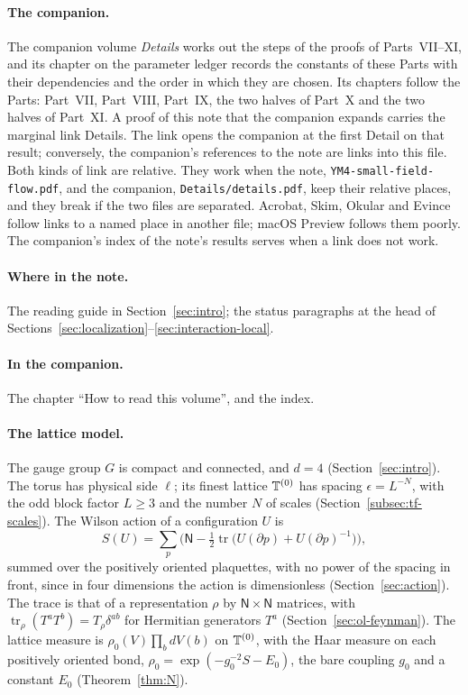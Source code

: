 \paragraph{The companion.} The companion volume \emph{Details} works out the steps of the proofs of Parts~VII--XI, and its chapter on the parameter ledger records the constants of these Parts with their dependencies and the order in which they are chosen. Its chapters follow the Parts: Part~VII, Part~VIII, Part~IX, the two halves of Part~X and the two halves of Part~XI. A proof of this note that the companion expands carries the marginal link \textsf{Details}. The link opens the companion at the first Detail on that result; conversely, the companion's references to the note are links into this file. Both kinds of link are relative. They work when the note, \texttt{YM4-small-field-flow.pdf}, and the companion, \texttt{Details/details.pdf}, keep their relative places, and they break if the two files are separated. Acrobat, Skim, Okular and Evince follow links to a named place in another file; macOS Preview follows them poorly. The companion's index of the note's results serves when a link does not work.

\paragraph{Where in the note.} The reading guide in Section~\ref{sec:intro}; the status paragraphs at the head of Sections~\ref{sec:localization}--\ref{sec:interaction-local}.

\paragraph{In the companion.} The chapter ``How to read this volume'', and the index.

\label{g:result}

\paragraph{The lattice model.} The gauge group $G$ is compact and connected, and $d=4$ (Section~\ref{sec:intro}). The torus has physical side $\ell$; its finest lattice $\mathbb T^{(0)}$ has spacing $\epsilon=L^{-N}$, with the odd block factor $L\ge3$ and the number $N$ of scales (Section~\ref{subsec:tf-scales}). The Wilson action of a configuration $U$ is
\[
S(U)=\sum_p\Big(\mathsf N-\tfrac12\operatorname{tr}\big(U(\partial p)+U(\partial p)^{-1}\big)\Big),
\]
summed over the positively oriented plaquettes, with no power of the spacing in front, since in four dimensions the action is dimensionless (Section~\ref{sec:action}). The trace is that of a representation $\rho$ by $\mathsf N\times\mathsf N$ matrices, with $\operatorname{tr}_\rho(T^aT^b)=T_\rho\delta^{ab}$ for Hermitian generators $T^a$ (Section~\ref{sec:ol-feynman}). The lattice measure is $\rho_0(V)\prod_bdV(b)$ on $\mathbb T^{(0)}$, with the Haar measure on each positively oriented bond, $\rho_0=\exp(-g_0^{-2}S-E_0)$, the bare coupling $g_0$ and a constant $E_0$ (Theorem~\ref{thm:N}).

